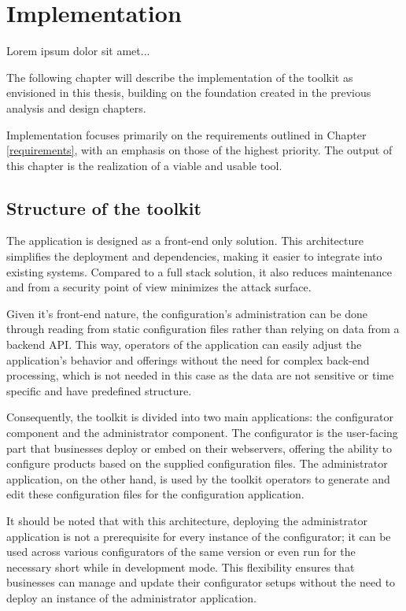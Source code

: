 \chapter{Implementation}

\begin{chapterabstract}
Lorem ipsum dolor sit amet...
\end{chapterabstract}

The following chapter will describe the implementation of the toolkit as envisioned in this thesis, building on the foundation created in the previous analysis and design chapters. 

Implementation focuses primarily on the requirements outlined in Chapter \ref{requirements}, with an emphasis on those of the highest priority. The output of this chapter is the realization of a viable and usable tool.

\section{Structure of the toolkit}

The application is designed as a front-end only solution. This architecture simplifies the deployment and dependencies, making it easier to integrate into existing systems. Compared to a full stack solution, it also reduces maintenance and from a security point of view minimizes the attack surface. 

Given it's front-end nature, the configuration's administration can be done through reading from static configuration files rather than relying on data from a backend API. This way, operators of the application can easily adjust the application's behavior and offerings without the need for complex back-end processing, which is not needed in this case as the data are not sensitive or time specific and have predefined structure. 

Consequently, the toolkit is divided into two main applications: the configurator component and the administrator component. The configurator is the user-facing part that businesses deploy or embed on their webservers, offering the ability to configure products based on the supplied configuration files. The administrator application, on the other hand, is used by the toolkit operators to generate and edit these configuration files for the configuration application.

It should be noted that with this architecture, deploying the administrator application is not a prerequisite for every instance of the configurator; it can be used across various configurators of the same version or even run for the necessary short while in development mode. This flexibility ensures that businesses can manage and update their configurator setups without the need to deploy an instance of the administrator application.

